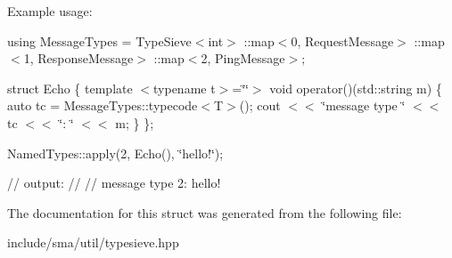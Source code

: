 Example usage\-:

using Message\-Types = Type\-Sieve$<$int$>$ \-::map$<$0, Request\-Message$>$ \-::map$<$1, Response\-Message$>$ \-::map$<$2, Ping\-Message$>$;

struct Echo \{ template $<$typename t$>$=\char`\"{}\char`\"{}$>$ void operator()(std\-::string m) \{ auto tc = Message\-Types\-::typecode$<$\-T$>$(); cout $<$$<$ \char`\"{}message type \char`\"{} $<$$<$ tc $<$$<$ \char`\"{}\-: \char`\"{} $<$$<$ m; \} \};

Named\-Types\-::apply(2, Echo(), \char`\"{}hello!\char`\"{});

// output\-: // // message type 2\-: hello! 

The documentation for this struct was generated from the following file\-:\begin{DoxyCompactItemize}
\item 
include/sma/util/typesieve.\-hpp\end{DoxyCompactItemize}
